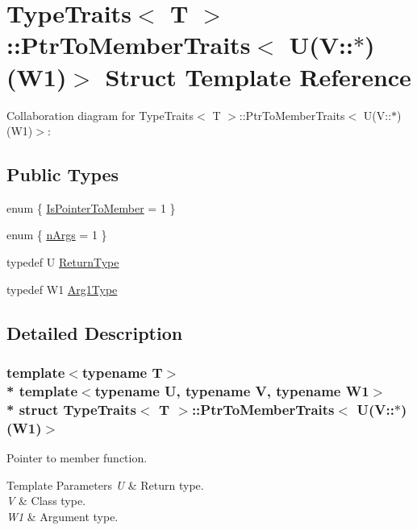 \hypertarget{structTypeTraits_1_1PtrToMemberTraits_3_01U_07V_1_1_5_08_07W1_08_4}{}\section{Type\+Traits$<$ T $>$\+:\+:Ptr\+To\+Member\+Traits$<$ U(V\+:\+:$\ast$)(W1)$>$ Struct Template Reference}
\label{structTypeTraits_1_1PtrToMemberTraits_3_01U_07V_1_1_5_08_07W1_08_4}


Collaboration diagram for Type\+Traits$<$ T $>$\+:\+:Ptr\+To\+Member\+Traits$<$ U(V\+:\+:$\ast$)(W1)$>$\+:
\subsection*{Public Types}
\begin{DoxyCompactItemize}
\item 
enum \{ \hyperlink{structTypeTraits_1_1PtrToMemberTraits_3_01U_07V_1_1_5_08_07W1_08_4_a32c1df21d0d7e8d193befaace5f38f8ca0d2e8dc4c60b619a57d82b6fe1dae4a0}{Is\+Pointer\+To\+Member} = 1
 \}
\item 
enum \{ \hyperlink{structTypeTraits_1_1PtrToMemberTraits_3_01U_07V_1_1_5_08_07W1_08_4_ac385aa5febb4f5a460c0d4558c52ad60a93224bd4f506a982c29eb9f110177d6a}{n\+Args} = 1
 \}
\item 
typedef U \hyperlink{structTypeTraits_1_1PtrToMemberTraits_3_01U_07V_1_1_5_08_07W1_08_4_aa75fe26d5dff89def4817a69df3c1cc3}{Return\+Type}
\item 
typedef W1 \hyperlink{structTypeTraits_1_1PtrToMemberTraits_3_01U_07V_1_1_5_08_07W1_08_4_a07b7348f01bcc4b6bceffd73e77c19b9}{Arg1\+Type}
\end{DoxyCompactItemize}


\subsection{Detailed Description}
\subsubsection*{template$<$typename T$>$\\*
template$<$typename U, typename V, typename W1$>$\\*
struct Type\+Traits$<$ T $>$\+::\+Ptr\+To\+Member\+Traits$<$ U(\+V\+::$\ast$)(\+W1)$>$}

Pointer to member function. 
\begin{DoxyTemplParams}{Template Parameters}
{\em U} & Return type. \\
\hline
{\em V} & Class type. \\
\hline
{\em W1} & Argument type. \\
\hline
\end{DoxyTemplParams}


